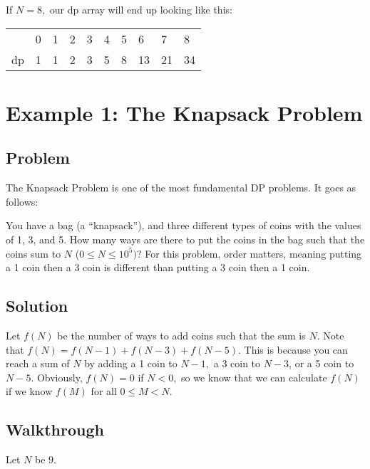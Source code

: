 \documentclass{article}
\begin{document}
If $N = 8,$ our dp array will end up looking like this: 
\begin{table}[h]
\begin{tabular}{llllllllll}
                        & 0                      & 1                      & 2                      & 3                      & 4                      & 5                      & 6                       & 7                       & 8                       \\ \cline{2-10} 
\multicolumn{1}{l|}{dp} & \multicolumn{1}{l|}{1} & \multicolumn{1}{l|}{1} & \multicolumn{1}{l|}{2} & \multicolumn{1}{l|}{3} & \multicolumn{1}{l|}{5} & \multicolumn{1}{l|}{8} & \multicolumn{1}{l|}{13} & \multicolumn{1}{l|}{21} & \multicolumn{1}{l|}{34} \\ \cline{2-10} 
\end{tabular}
\end{table}

\section{Example 1: The Knapsack Problem}
\subsection{Problem}
The Knapsack Problem is one of the most fundamental DP problems. It goes as follows:

You have a bag (a ``knapsack''), and three different types of coins with the values of 1, 3, and 5. How many ways are there to put the coins in the bag such that the coins sum to $N$ ($0 \leq N \leq 10^5)?$ For this problem, order matters, meaning putting a 1 coin then a 3 coin is different than putting a 3 coin then a 1 coin.

\subsection{Solution}
Let $f(N)$ be the number of ways to add coins such that the sum is $N.$ Note that $f(N) = f(N-1) + f(N-3) + f(N-5).$ This is because you can reach a sum of $N$ by adding a 1 coin to $N-1,$ a 3 coin to $N-3$, or a 5 coin to $N-5.$ Obviously, $f(N) = 0$ if $N < 0,$ so we know that we can calculate $f(N)$ if we know $f(M)$ for all $0 \leq M < N.$ 

\subsection{Walkthrough}
Let $N$ be $9.$
\end{document}
